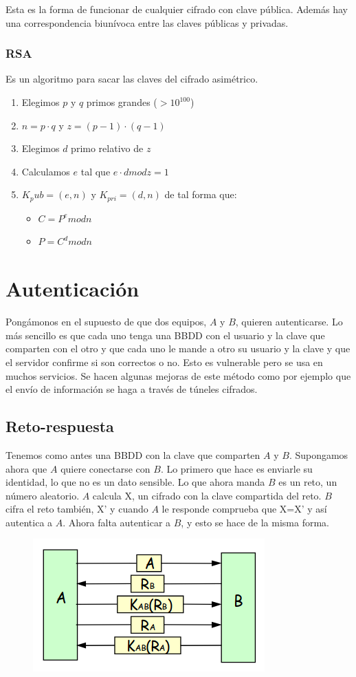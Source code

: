 Esta es la forma de funcionar de cualquier cifrado con clave pública. Además hay una correspondencia biunívoca entre las claves públicas y privadas. 
\subsubsection{RSA\@}
\noindent
Es un algoritmo para sacar las claves del cifrado asimétrico. 
\begin{enumerate}
    
    \item Elegimos $p$ y $q$ primos grandes ($>10^{100}$)
    \item $n = p\cdot q$ y $z = (p-1)\cdot(q-1)$
    \item Elegimos $d$ primo relativo de $z$
    \item Calculamos $e$ tal que $e\cdot d mod z = 1$
    \item $K_pub = (e,n)$ y $K_{pri} = (d,n)$ de tal forma que:
        \begin{itemize}
            \item $C=P^e modn$
            \item $P=C^d modn$
        \end{itemize}
\end{enumerate}

\section{Autenticación}
Pongámonos en el supuesto de que dos equipos, $A$ y $B$, quieren autenticarse. Lo más sencillo es que cada uno tenga una BBDD con el usuario y la clave que comparten con el otro y que cada uno le mande a otro su usuario y la clave y que el servidor confirme si son correctos o no. Esto es vulnerable pero se usa en muchos servicios. Se hacen algunas mejoras de este método como por ejemplo que el envío de información se haga a través de túneles cifrados. 

\subsection{Reto-respuesta}
Tenemos como antes una BBDD con la clave que comparten $A$ y $B$. Supongamos ahora que $A$ quiere conectarse con $B$. Lo primero que hace es enviarle su identidad, lo que no es un dato sensible. Lo que ahora manda $B$ es un reto, un número aleatorio. $A$ calcula X, un cifrado con la clave compartida del reto. $B$ cifra el reto también, X' y cuando $A$ le responde comprueba que X=X' y así autentica a $A$. Ahora falta autenticar a $B$, y esto se hace de la misma forma. 
\begin{figure}[H]
    \centering
    \includegraphics[width=0.4\linewidth]{./images/reto-respuesta.png}
    \label{fig:reto-respuesta}
\end{figure}

